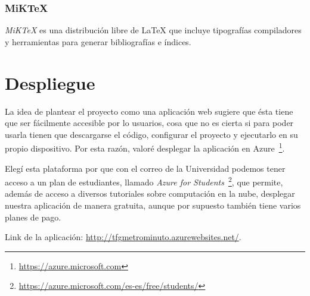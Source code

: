 \subsubsection{MiK\TeX}
\textit{MiK\TeX} es una distribución libre de \LaTeX{} que incluye tipografías compiladores y herramientas para generar bibliografías e índices.


\section{Despliegue}
La idea de plantear el proyecto como una aplicación web sugiere que ésta tiene que ser fácilmente accesible por lo usuarios, cosa que no es cierta si para poder usarla tienen que descargarse el código, configurar el proyecto y ejecutarlo en su propio dispositivo. Por esta razón, valoré desplegar la aplicación en Azure~\footnote{\url{https://azure.microsoft.com}}.

Elegí esta plataforma por que con el correo de la Universidad podemos tener acceso a un plan de estudiantes, llamado \textit{Azure for Students}~\footnote{\url{https://azure.microsoft.com/es-es/free/students/}}, que permite, además de acceso a diversos tutoriales sobre computación en la nube, desplegar nuestra aplicación de manera gratuita, aunque por supuesto también tiene varios planes de pago.


Link de la aplicación: \url{http://tfgmetrominuto.azurewebsites.net/}.